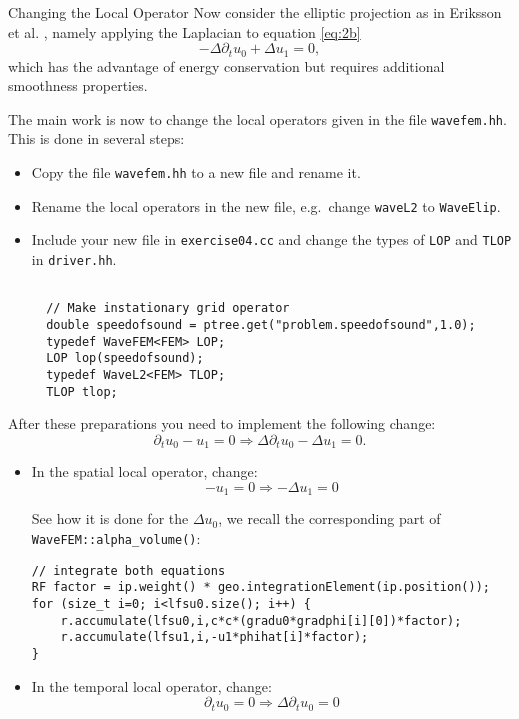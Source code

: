 \documentclass[12pt,a4paper]{article}
\begin{document}
\begin{Exercise}{Changing the Local Operator}
Now consider the elliptic projection as in Eriksson et al. \cite{Eriksson}, namely applying the Laplacian to equation \eqref{eq:2b}
\begin{equation}\label{eq:elip}
-\Delta \partial_t u_0 + \Delta u_1 = 0,
\end{equation}
which has the advantage of  energy conservation but requires additional smoothness properties.


The main work is now to change the local operators given in the
  file \lstinline{wavefem.hh}. This is done in several steps:
  \begin{itemize}
  \item Copy the file \lstinline{wavefem.hh} to a new file and rename it.
  \item Rename the local operators in the new file, e.g.~change \lstinline{waveL2} to \lstinline{WaveElip}.
  \item Include your new file in \lstinline{exercise04.cc} and change the types of \lstinline{LOP} and \lstinline{TLOP} in \lstinline{driver.hh}.
  \begin{lstlisting}

  // Make instationary grid operator
  double speedofsound = ptree.get("problem.speedofsound",1.0);
  typedef WaveFEM<FEM> LOP;
  LOP lop(speedofsound);
  typedef WaveL2<FEM> TLOP;
  TLOP tlop;
  \end{lstlisting}
\end{itemize}

After these preparations you need to implement the following change:
$$ \partial_t u_0 - u_1 = 0 \Rightarrow \Delta \partial_t u_0 - \Delta u_1 = 0.$$

\begin{itemize}

\item In the spatial local operator, change:
$$ - u_1 = 0 \Rightarrow -  \Delta u_1 = 0$$

See how it is done for the $\Delta u_0$, we recall the corresponding part of \lstinline{WaveFEM::alpha_volume()}:
  \begin{lstlisting}
// integrate both equations
RF factor = ip.weight() * geo.integrationElement(ip.position());
for (size_t i=0; i<lfsu0.size(); i++) {
	r.accumulate(lfsu0,i,c*c*(gradu0*gradphi[i][0])*factor);
	r.accumulate(lfsu1,i,-u1*phihat[i]*factor);
}
  \end{lstlisting}


\item In the temporal local operator, change:
 $$ \partial_t u_0  = 0 \Rightarrow \Delta \partial_t u_0= 0$$


\end{itemize}
\end{Exercise}
\end{document}
